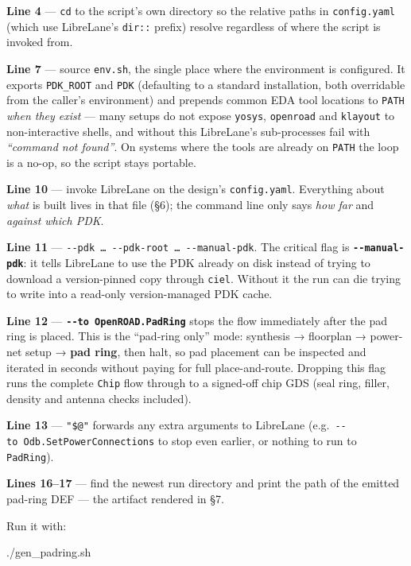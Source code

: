 \documentclass[
  11pt,
  a4paper,
]{article}
\newenvironment{Shaded}{}{}
\newcommand{\ExtensionTok}[1]{#1}
\begin{document}
\textbf{Line 4} --- \texttt{cd} to the script's own directory so the
relative paths in \texttt{config.yaml} (which use LibreLane's
\texttt{dir::} prefix) resolve regardless of where the script is invoked
from.

\textbf{Line 7} --- source \texttt{env.sh}, the single place where the
environment is configured. It exports \texttt{PDK\_ROOT} and
\texttt{PDK} (defaulting to a standard installation, both overridable
from the caller's environment) and prepends common EDA tool locations to
\texttt{PATH} \emph{when they exist} --- many setups do not expose
\texttt{yosys}, \texttt{openroad} and \texttt{klayout} to
non-interactive shells, and without this LibreLane's sub-processes fail
with \emph{``command not found''}. On systems where the tools are
already on \texttt{PATH} the loop is a no-op, so the script stays
portable.

\textbf{Line 10} --- invoke LibreLane on the design's
\texttt{config.yaml}. Everything about \emph{what} is built lives in
that file (§6); the command line only says \emph{how far} and
\emph{against which PDK}.

\textbf{Line 11} ---
\texttt{-\/-pdk\ …\ -\/-pdk-root\ …\ -\/-manual-pdk}. The critical flag
is \textbf{\texttt{-\/-manual-pdk}}: it tells LibreLane to use the PDK
already on disk instead of trying to download a version-pinned copy
through \texttt{ciel}. Without it the run can die trying to write into a
read-only version-managed PDK cache.

\textbf{Line 12} --- \textbf{\texttt{-\/-to\ OpenROAD.PadRing}} stops
the flow immediately after the pad ring is placed. This is the
``pad-ring only'' mode: synthesis → floorplan → power-net setup →
\textbf{pad ring}, then halt, so pad placement can be inspected and
iterated in seconds without paying for full place-and-route. Dropping
this flag runs the complete \texttt{Chip} flow through to a signed-off
chip GDS (seal ring, filler, density and antenna checks included).

\textbf{Line 13} --- \texttt{"\$@"} forwards any extra arguments to
LibreLane (e.g.~\texttt{-\/-to\ Odb.SetPowerConnections} to stop even
earlier, or nothing to run to \texttt{PadRing}).

\textbf{Lines 16--17} --- find the newest run directory and print the
path of the emitted pad-ring DEF --- the artifact rendered in §7.

Run it with:

\begin{Shaded}
\begin{Highlighting}[]
\ExtensionTok{./gen\_padring.sh}
\end{Highlighting}
\end{Shaded}
\end{document}
